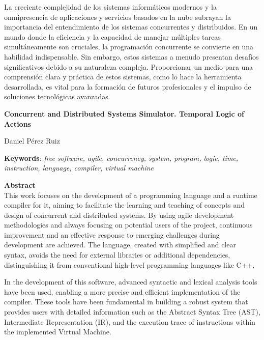 La creciente complejidad de los sistemas informáticos modernos y la omnipresencia de aplicaciones y servicios basados en la nube subrayan la importancia del entendimiento de los sistemas concurrentes y distribuidos. En un mundo donde la eficiencia y la capacidad de manejar múltiples tareas simultáneamente son cruciales, la programación concurrente se convierte en una habilidad indispensable. Sin embargo, estos sistemas a menudo presentan desafíos significativos debido a su naturaleza compleja. Proporcionar un medio para una comprensión clara y práctica de estos sistemas, como lo hace la herramienta desarrollada, es vital para la formación de futuros profesionales y el impulso de soluciones tecnológicas avanzadas.

\cleardoublepage

\begin{center}
	{\large\bfseries Concurrent and Distributed Systems Simulator. Temporal Logic of Actions}\\
\end{center}
\begin{center}
	Daniel Pérez Ruiz\\
\end{center}
\vspace{0.5cm}
\noindent\textbf{Keywords}: \textit{free software, agile, concurrency, system, program, logic, time, instruction, language, compiler, virtual machine}
\vspace{0.7cm}

\noindent\textbf{Abstract}\\
This work focuses on the development of a programming language and a runtime compiler for it, aiming to facilitate the learning and teaching of concepts and design of concurrent and distributed systems. By using agile development methodologies and always focusing on potential users of the project, continuous improvement and an effective response to emerging challenges during development are achieved. The language, created with simplified and clear syntax, avoids the need for external libraries or additional dependencies, distinguishing it from conventional high-level programming languages like C++.

In the development of this software, advanced syntactic and lexical analysis tools have been used, enabling a more precise and efficient implementation of the compiler. These tools have been fundamental in building a robust system that provides users with detailed information such as the Abstract Syntax Tree (AST), Intermediate Representation (IR), and the execution trace of instructions within the implemented Virtual Machine.

